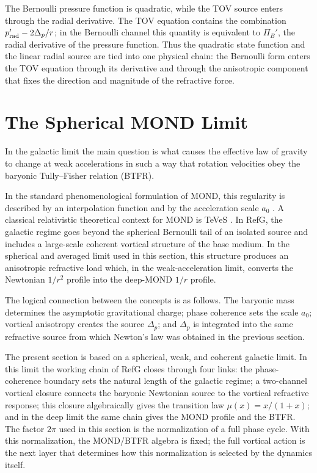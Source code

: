 \documentclass[12pt]{article}
\begin{document}
The Bernoulli pressure function is quadratic, while the TOV source enters through the radial derivative. The TOV equation contains the combination $p_{\rm rad}'-2\Delta_p/r$; in the Bernoulli channel this quantity is equivalent to $\Pi_B'$, the radial derivative of the pressure function. Thus the quadratic state function and the linear radial source are tied into one physical chain: the Bernoulli form enters the TOV equation through its derivative and through the anisotropic component that fixes the direction and magnitude of the refractive force.

\section{The Spherical MOND Limit}

In the galactic limit the main question is what causes the effective law of gravity to change at weak accelerations in such a way that rotation velocities obey the baryonic Tully--Fisher relation (BTFR).

In the standard phenomenological formulation of MOND, this regularity is described by an interpolation function and by the acceleration scale $a_0$ \cite{Milgrom1983}. A classical relativistic theoretical context for MOND is TeVeS \cite{Bekenstein2004}. In RefG, the galactic regime goes beyond the spherical Bernoulli tail of an isolated source and includes a large-scale coherent vortical structure of the base medium. In the spherical and averaged limit used in this section, this structure produces an anisotropic refractive load which, in the weak-acceleration limit, converts the Newtonian $1/r^2$ profile into the deep-MOND $1/r$ profile.

The logical connection between the concepts is as follows. The baryonic mass determines the asymptotic gravitational charge; phase coherence sets the scale $a_0$; vortical anisotropy creates the source $\Delta_p$; and $\Delta_p$ is integrated into the same refractive source from which Newton's law was obtained in the previous section.

The present section is based on a spherical, weak, and coherent galactic limit. In this limit the working chain of RefG closes through four links: the phase-coherence boundary sets the natural length of the galactic regime; a two-channel vortical closure connects the baryonic Newtonian source to the vortical refractive response; this closure algebraically gives the transition law $\mu(x)=x/(1+x)$; and in the deep limit the same chain gives the MOND profile and the BTFR. The factor $2\pi$ used in this section is the normalization of a full phase cycle. With this normalization, the MOND/BTFR algebra is fixed; the full vortical action is the next layer that determines how this normalization is selected by the dynamics itself.
\end{document}
